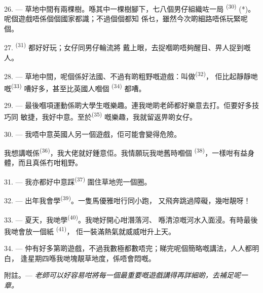 
26. --- 草地中間有兩棵樹。喺其中一棵樹腳下，七八個男仔組織咗一局
\textsuperscript{(30)} (*)。呢個遊戲唔係個個國家都識；不過個個都知
係乜，雖然今次啲細路唔係玩緊呢個。

\VUsaut{5.0mm}
\VUsaut{3.4mm}

27. \textsuperscript{(31)} 都好好玩；女仔同男仔輪流將
戴上眼，去捉嗰啲唔夠醒目、畀人捉到嘅人。

28. --- 草地中間，呢個係好法國、不過有啲粗野嘅遊戲：叫做\textsuperscript{(32)}，
佢比起靜靜哋嘅\textsuperscript{(33)} 嘈好多，甚至比英國人嗰個
\textsuperscript{(34)} 都嘈。

29. --- 最後嗰項運動係啲大學生嘅樂趣。連我哋啲老師都好樂意去打。佢要好多技巧同
敏捷，我好中意。至於\textsuperscript{(35)} 嘅樂趣，我就留返畀啲女仔。

30. --- 我唔中意英國人另一個遊戲，佢可能會變得危險。

我想講嘅係\textsuperscript{(36)}，我大佬就好鍾意佢。我情願玩我哋舊時嗰個
\textsuperscript{(38)}，一樣咁有益身體，而且真係冇咁粗野。

\VUsaut{4.6mm}
\VUsaut{3.0mm}

31. --- 我亦都好中意踩\textsuperscript{(37)} 圍住草地兜一個圈。

32. --- 出年我會學\textsuperscript{(39)}。一隻馬優雅咁行同小跑，
又飛奔跳過障礙，幾咁靚呀！

33. --- 夏天，我哋學\textsuperscript{(40)}。我哋好開心咁潛落河、
喺清涼嘅河水入面浸。有時最後我哋會放一個紙 \textsuperscript{(41)}，
佢一裝滿熱氣就威威咁升上天。

34. --- 仲有好多第啲遊戲，不過我數極都數唔完；睇完呢個簡略嘅講法，人人都明白，
逢星期四喺我哋塊靚草地度，係唔會悶嘅。

附註。--- \textit{老師可以好容易咁將每一個最重要嘅遊戲講得再詳細啲，去補足呢一章。}
\VUsaut{6.0mm}
\VUfilet{22mm}
